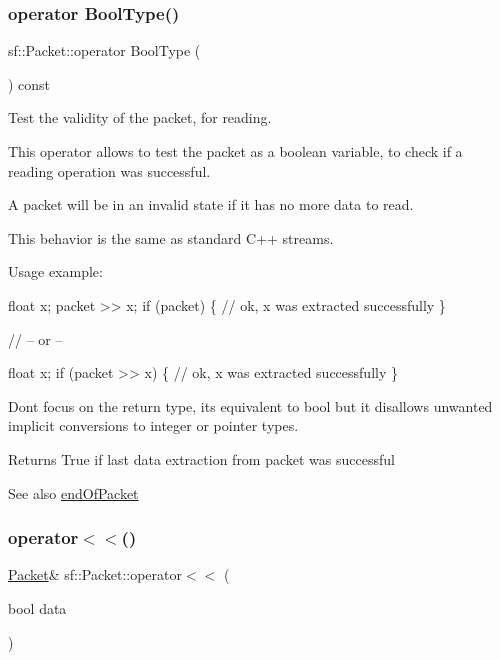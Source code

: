 \subsubsection{\texorpdfstring{operator Bool\+Type()}{operator BoolType()}}
{\footnotesize\ttfamily sf\+::\+Packet\+::operator Bool\+Type (\begin{DoxyParamCaption}{ }\end{DoxyParamCaption}) const}



Test the validity of the packet, for reading. 

This operator allows to test the packet as a boolean variable, to check if a reading operation was successful.

A packet will be in an invalid state if it has no more data to read.

This behavior is the same as standard C++ streams.

Usage example\+: 
\begin{DoxyCode}
\textcolor{keywordtype}{float} x;
packet >> x;
\textcolor{keywordflow}{if} (packet)
\{
   \textcolor{comment}{// ok, x was extracted successfully}
\}

\textcolor{comment}{// -- or --}

\textcolor{keywordtype}{float} x;
\textcolor{keywordflow}{if} (packet >> x)
\{
   \textcolor{comment}{// ok, x was extracted successfully}
\}
\end{DoxyCode}


Don\textquotesingle{}t focus on the return type, it\textquotesingle{}s equivalent to bool but it disallows unwanted implicit conversions to integer or pointer types.

\begin{DoxyReturn}{Returns}
True if last data extraction from packet was successful
\end{DoxyReturn}
\begin{DoxySeeAlso}{See also}
\hyperlink{classsf_1_1_packet_a61e354fa670da053907c14b738839560}{end\+Of\+Packet} 
\end{DoxySeeAlso}
\mbox{\label{classsf_1_1_packet_aa5a465ed02ba29d83ecdafb0ac3fff21}} 
\subsubsection{\texorpdfstring{operator$<$$<$()}{operator<<()}}
{\footnotesize\ttfamily \hyperlink{classsf_1_1_packet}{Packet}\& sf\+::\+Packet\+::operator$<$$<$ (\begin{DoxyParamCaption}\item[{bool}]{data }\end{DoxyParamCaption})}

